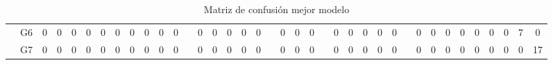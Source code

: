 \documentclass[12pt]{article}
\begin{document}
\begin{table}[!ht]
{\begin{tabular}{cccccccccccccccccccccccccccccccccccccc}
\multicolumn{1}{c|}{}                       & \multicolumn{1}{c|}{G6}  & \multicolumn{1}{c|}{0}  & \multicolumn{1}{c|}{0}  & \multicolumn{1}{c|}{0}  & \multicolumn{1}{c|}{0}  & \multicolumn{1}{c|}{0}  & \multicolumn{1}{c|}{0}  & \multicolumn{1}{c|}{0}  & \multicolumn{1}{c|}{0}  & \multicolumn{1}{c|}{0}  & \multicolumn{1}{c|}{0}  & \multicolumn{1}{c|}{}                     & \multicolumn{1}{c|}{0}  & \multicolumn{1}{c|}{0}  & \multicolumn{1}{c|}{0}  & \multicolumn{1}{c|}{0}  & \multicolumn{1}{c|}{0}  & \multicolumn{1}{c|}{}                     & \multicolumn{1}{c|}{0}  & \multicolumn{1}{c|}{0}  & \multicolumn{1}{c|}{0}  & \multicolumn{1}{c|}{}                     & \multicolumn{1}{c|}{0}  & \multicolumn{1}{c|}{0}  & \multicolumn{1}{c|}{0}  & \multicolumn{1}{c|}{0}  & \multicolumn{1}{c|}{0}  & \multicolumn{1}{c|}{}                     & \multicolumn{1}{c|}{0}  & \multicolumn{1}{c|}{0}  & \multicolumn{1}{c|}{0}  & \multicolumn{1}{c|}{0}  & \multicolumn{1}{c|}{0}  & \multicolumn{1}{c|}{0}  & \multicolumn{1}{c|}{0}  & \multicolumn{1}{c|}{7}  & \multicolumn{1}{c|}{0}  \\ \cline{2-12} \cline{14-18} \cline{20-22} \cline{24-28} \cline{30-38} 
\multicolumn{1}{c|}{}                       & \multicolumn{1}{c|}{G7}  & \multicolumn{1}{c|}{0}  & \multicolumn{1}{c|}{0}  & \multicolumn{1}{c|}{0}  & \multicolumn{1}{c|}{0}  & \multicolumn{1}{c|}{0}  & \multicolumn{1}{c|}{0}  & \multicolumn{1}{c|}{0}  & \multicolumn{1}{c|}{0}  & \multicolumn{1}{c|}{0}  & \multicolumn{1}{c|}{0}  & \multicolumn{1}{c|}{}                     & \multicolumn{1}{c|}{0}  & \multicolumn{1}{c|}{0}  & \multicolumn{1}{c|}{0}  & \multicolumn{1}{c|}{0}  & \multicolumn{1}{c|}{0}  & \multicolumn{1}{c|}{}                     & \multicolumn{1}{c|}{0}  & \multicolumn{1}{c|}{0}  & \multicolumn{1}{c|}{0}  & \multicolumn{1}{c|}{}                     & \multicolumn{1}{c|}{0}  & \multicolumn{1}{c|}{0}  & \multicolumn{1}{c|}{0}  & \multicolumn{1}{c|}{0}  & \multicolumn{1}{c|}{0}  & \multicolumn{1}{c|}{}                     & \multicolumn{1}{c|}{0}  & \multicolumn{1}{c|}{0}  & \multicolumn{1}{c|}{0}  & \multicolumn{1}{c|}{0}  & \multicolumn{1}{c|}{0}  & \multicolumn{1}{c|}{0}  & \multicolumn{1}{c|}{0}  & \multicolumn{1}{c|}{0}  & \multicolumn{1}{c|}{17} \\ \cline{2-38} 
		\end{tabular}
	}
	\caption{Matriz de confusión mejor modelo }
	\label{tab:confusion_matrix_3}
\end{table}
\end{document}
